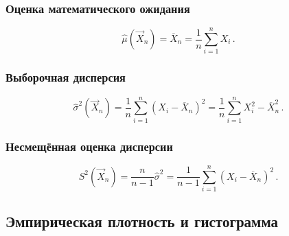 \subsubsection{Оценка математического ожидания}

\begin{equation}
    \hat{\mu}(\vec{X}_n) = \overline{X}_n = \frac{1}{n} \sum_{i = 1}^{n} X_i\,.
\end{equation}


\subsubsection{Выборочная дисперсия}

\begin{equation}
    \hat{\sigma}^2(\vec{X}_n) = \frac{1}{n} \sum_{i = 1}^{n}(X_i - \overline{X}_n)^2 = \frac{1}{n} \sum_{i = 1}^{n}X_i^2 - \overline{X}_n^2\,.
\end{equation}


\subsubsection{Несмещённая оценка дисперсии}

\begin{equation}
    S^2(\vec{X}_n) = \frac{n}{n - 1}\hat{\sigma}^2 = \frac{1}{n - 1}\sum_{i = 1}^{n} (X_i - \overline{X}_n)^2\,.
\end{equation}



\subsection{Эмпирическая плотность и гистограмма}

